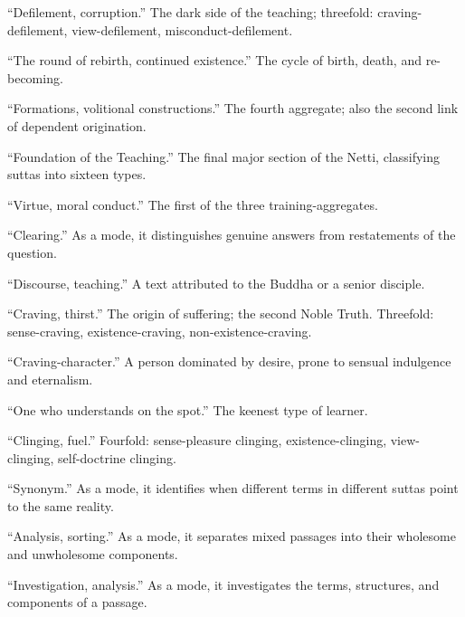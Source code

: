 \begin{description}[style=nextline, labelwidth=3.5cm, leftmargin=3.8cm, font=\itshape]
\item[saṃkilesa] ``Defilement, corruption.'' The dark side of the teaching; threefold: craving-defilement, view-defilement, misconduct-defilement.

\item[saṃsāra] ``The round of rebirth, continued existence.'' The cycle of birth, death, and re-becoming.

\item[saṅkhāra] ``Formations, volitional constructions.'' The fourth aggregate; also the second link of dependent origination.

\item[sāsanapaṭṭhāna] ``Foundation of the Teaching.'' The final major section of the Netti, classifying suttas into sixteen types.

\item[sīla] ``Virtue, moral conduct.'' The first of the three training-aggregates.

\item[sodhana] ``Clearing.'' As a mode, it distinguishes genuine answers from restatements of the question.

\item[sutta] ``Discourse, teaching.'' A text attributed to the Buddha or a senior disciple.

\item[taṇhā] ``Craving, thirst.'' The origin of suffering; the second Noble Truth. Threefold: sense-craving, existence-craving, non-existence-craving.

\item[taṇhācarita] ``Craving-character.'' A person dominated by desire, prone to sensual indulgence and eternalism.

\item[ugghaṭitaññū] ``One who understands on the spot.'' The keenest type of learner.

\item[upādāna] ``Clinging, fuel.'' Fourfold: sense-pleasure clinging, existence-clinging, view-clinging, self-doctrine clinging.

\item[vevacana] ``Synonym.'' As a mode, it identifies when different terms in different suttas point to the same reality.

\item[vibhatti] ``Analysis, sorting.'' As a mode, it separates mixed passages into their wholesome and unwholesome components.

\item[vicaya] ``Investigation, analysis.'' As a mode, it investigates the terms, structures, and components of a passage.


\end{description}
